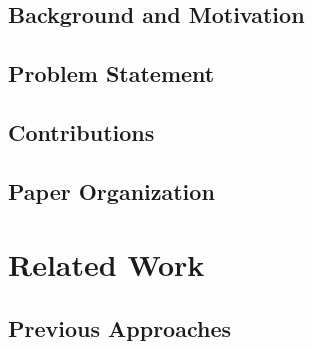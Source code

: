 \documentclass[11pt,a4paper]{article}
\begin{document}
\subsection{Background and Motivation}
\label{subsec:background}


\subsection{Problem Statement}
\label{subsec:problem}


\subsection{Contributions}
\label{subsec:contributions}


\subsection{Paper Organization}
\label{subsec:organization}


\section{Related Work}
\label{sec:related_work}


\subsection{Previous Approaches}
\label{subsec:previous_approaches}

\end{document}
